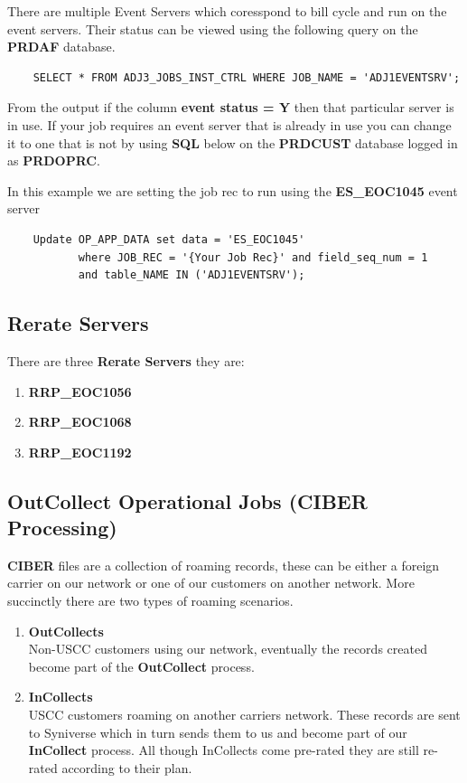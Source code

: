 \documentclass[12pt,twoside]{article}
\begin{document}
   There are multiple Event Servers which coresspond to bill cycle and run on the event servers.   
   Their status can be viewed using the following query on the \textbf{PRDAF} database. 
\begin{verbatim}
    SELECT * FROM ADJ3_JOBS_INST_CTRL WHERE JOB_NAME = 'ADJ1EVENTSRV';
\end{verbatim}
   From the output if the column \textbf{event status = Y} then that particular server is in use. 
   If your job requires an event server that is already in use you can change it to one that is not by using \textbf{SQL} below on the \textbf{PRDCUST} database logged in as \textbf{PRDOPRC}. 

   In this example we are setting the job rec to run using the \textbf{ES\_EOC1045} event server 

\begin{verbatim}
    Update OP_APP_DATA set data = 'ES_EOC1045'
           where JOB_REC = '{Your Job Rec}' and field_seq_num = 1 
           and table_NAME IN ('ADJ1EVENTSRV');
\end{verbatim}
\subsection{Rerate Servers}
\label{sec-3-5}

   There are three \textbf{Rerate Servers} they are:
\small
\begin{enumerate}
\item \textbf{RRP\_EOC1056}
\item \textbf{RRP\_EOC1068}
\item \textbf{RRP\_EOC1192}
\end{enumerate}
\normalsize
\subsection{OutCollect Operational Jobs (CIBER Processing)}
\label{sec-3-6}

  \textbf{CIBER} files are a collection of roaming records, these can be
  either a foreign carrier on our network or one of our customers
  on another network. More succinctly there are two
  types of roaming scenarios.
\begin{enumerate}
\item \textbf{OutCollects}\\ Non-USCC customers using our network, eventually
       the records created become part of the \textbf{OutCollect} process.
\item \textbf{InCollects}\\ USCC customers roaming on another carriers
       network. These records are sent to Syniverse which in turn
       sends them to us and become part of our \textbf{InCollect} process. All though InCollects come pre-rated they are still re-rated according to their plan.
\end{enumerate}
\end{document}
